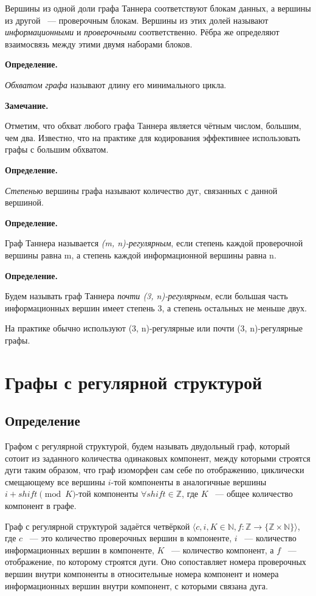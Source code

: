 \documentclass[14pt]{mmcs-article}
\begin{document}
Вершины из одной доли графа Таннера соответствуют блокам данных, а вершины из другой ~--- проверочным блокам. Вершины из этих долей называют \textsl{информационными} и \textsl{проверочными} соответственно. Рёбра же определяют взаимосвязь между этими двумя наборами блоков.

\textbf{Определение.}

\textsl{Обхватом графа} называют длину его минимального цикла.

\textbf{Замечание.}

Отметим, что обхват любого графа Таннера является чётным числом, большим, чем два. Известно, что на практике для кодирования эффективнее использовать графы с большим обхватом.

\textbf{Определение.}

\textsl{Степенью} вершины графа называют количество дуг, связанных с данной вершиной.

\textbf{Определение.}

Граф Таннера называется \textsl{(m, n)-регулярным}, если степень каждой проверочной вершины равна m, а степень каждой информационной вершины равна n.

\textbf{Определение.}

Будем называть граф Таннера \textsl{почти (3, n)-регулярным}, если большая часть информационных вершин имеет степень 3, а степень остальных не меньше двух.

На практике обычно используют (3, n)-регулярные или почти (3, n)-регулярные графы.


\section{Графы с регулярной структурой}

\subsection{Определение}

Графом с регулярной структурой, будем называть двудольный граф, который сотоит из заданного количества одинаковых компонент, между которыми строятся дуги таким образом, что граф изоморфен сам себе по отображению, циклически смещающему все вершины $i$-той компоненты в аналогичные вершины $i + shift \pmod K$-той компоненты $\forall shift \in \mathbb{Z}$, где $K$ ~--- общее количество компонент в графе.

Граф с регулярной структурой задаётся четвёркой $\langle c, i, K \in \mathbb{N}, f: \mathbb{Z} \rightarrow \{ \mathbb{Z} \times \mathbb{N} \} \rangle$, где $c$ ~--- это количество проверочных вершин в компоненте, $i$ ~--- количество информационных вершин в компоненте, $K$ ~--- количество компонент, а $f$ ~--- отображение, по которому строятся дуги. Оно сопоставляет номера проверочных вершин внутри компоненты в относительные номера компонент и номера информационных вершин внутри компонент, с которыми связана дуга.
\end{document}
